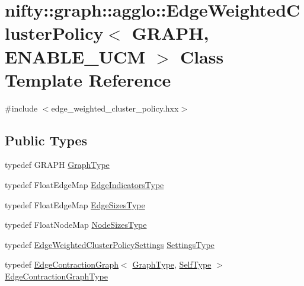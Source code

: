 \hypertarget{classnifty_1_1graph_1_1agglo_1_1EdgeWeightedClusterPolicy}{}\section{nifty\+:\+:graph\+:\+:agglo\+:\+:Edge\+Weighted\+Cluster\+Policy$<$ G\+R\+A\+PH, E\+N\+A\+B\+L\+E\+\_\+\+U\+CM $>$ Class Template Reference}
\label{classnifty_1_1graph_1_1agglo_1_1EdgeWeightedClusterPolicy}


{\ttfamily \#include $<$edge\+\_\+weighted\+\_\+cluster\+\_\+policy.\+hxx$>$}

\subsection*{Public Types}
\begin{DoxyCompactItemize}
\item 
typedef G\+R\+A\+PH \hyperlink{classnifty_1_1graph_1_1agglo_1_1EdgeWeightedClusterPolicy_a8e910f7b9d0c1baa1de7b6b1c3e58397}{Graph\+Type}
\item 
typedef Float\+Edge\+Map \hyperlink{classnifty_1_1graph_1_1agglo_1_1EdgeWeightedClusterPolicy_a1b8107133a86be855885f1910652b0af}{Edge\+Indicators\+Type}
\item 
typedef Float\+Edge\+Map \hyperlink{classnifty_1_1graph_1_1agglo_1_1EdgeWeightedClusterPolicy_a64d646cc14e503e9a76a4646234d9754}{Edge\+Sizes\+Type}
\item 
typedef Float\+Node\+Map \hyperlink{classnifty_1_1graph_1_1agglo_1_1EdgeWeightedClusterPolicy_a44ba54059efcb57c8c8091016fb9ee99}{Node\+Sizes\+Type}
\item 
typedef \hyperlink{structnifty_1_1graph_1_1agglo_1_1EdgeWeightedClusterPolicySettings}{Edge\+Weighted\+Cluster\+Policy\+Settings} \hyperlink{classnifty_1_1graph_1_1agglo_1_1EdgeWeightedClusterPolicy_a6c9e2acec086a9fcc4391f067a4ded46}{Settings\+Type}
\item 
typedef \hyperlink{classnifty_1_1graph_1_1EdgeContractionGraph}{Edge\+Contraction\+Graph}$<$ \hyperlink{classnifty_1_1graph_1_1agglo_1_1EdgeWeightedClusterPolicy_a8e910f7b9d0c1baa1de7b6b1c3e58397}{Graph\+Type}, \hyperlink{classnifty_1_1graph_1_1agglo_1_1EdgeWeightedClusterPolicy}{Self\+Type} $>$ \hyperlink{classnifty_1_1graph_1_1agglo_1_1EdgeWeightedClusterPolicy_af2c3024ed1be514c58004dfa7e77448b}{Edge\+Contraction\+Graph\+Type}
\end{DoxyCompactItemize}

